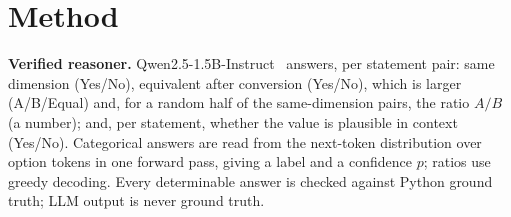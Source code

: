 \documentclass[conference]{IEEEtran}
\begin{document}
\section{Method}
\label{sec:method}
\textbf{Verified reasoner.} Qwen2.5-1.5B-Instruct~\cite{qwen2025qwen25} answers, per statement pair: same dimension
(Yes/No), equivalent after conversion (Yes/No), which is larger (A/B/Equal) and, for a random half of the same-dimension pairs, the ratio $A/B$ (a number); and, per
statement, whether the value is plausible in context (Yes/No). Categorical answers are read from the next-token
distribution over option tokens in one forward pass, giving a label and a confidence $p$; ratios use greedy decoding.
Every determinable answer is checked against Python ground truth; LLM output is never ground truth.
\end{document}
